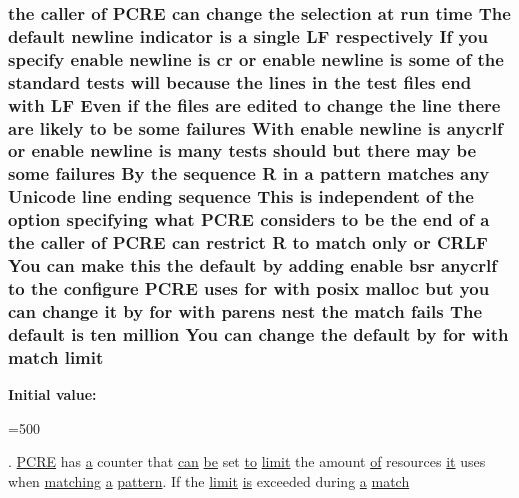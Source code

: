 \subsubsection[{\texorpdfstring{limit}{limit}}]{\setlength{\rightskip}{0pt plus 5cm}the caller {\bf of} {\bf P\+C\+RE} {\bf can} change the selection at {\bf run} {\bf time} The {\bf default} {\bf newline} indicator {\bf is} {\bf a} single {\bf LF} {\bf respectively} If you specify enable {\bf newline} {\bf is} {\bf cr} {\bf or} enable {\bf newline} {\bf is} some {\bf of} the standard {\bf tests} will because the {\bf lines} {\bf in} the test {\bf files} {\bf end} {\bf with} {\bf LF} Even {\bf if} the {\bf files} {\bf are} edited {\bf to} change the {\bf line} there {\bf are} likely {\bf to} {\bf be} some failures With enable {\bf newline} {\bf is} anycrlf {\bf or} enable {\bf newline} {\bf is} many {\bf tests} should but there may {\bf be} some failures By the {\bf sequence} {\bf R} {\bf in} {\bf a} {\bf pattern} {\bf matches} {\bf any} {\bf Unicode} {\bf line} ending {\bf sequence} This {\bf is} independent {\bf of} the {\bf option} {\bf specifying} {\bf what} {\bf P\+C\+RE} considers {\bf to} {\bf be} the {\bf end} {\bf of} {\bf a} the caller {\bf of} {\bf P\+C\+RE} {\bf can} restrict {\bf R} {\bf to} {\bf match} only {\bf or} {\bf C\+R\+LF} You {\bf can} {\bf make} {\bf this} the {\bf default} by {\bf adding} enable bsr anycrlf {\bf to} the {\bf configure} {\bf P\+C\+RE} uses for {\bf with} posix {\bf malloc} but you {\bf can} change {\bf it} by for {\bf with} parens nest the {\bf match} {\bf fails} The {\bf default} {\bf is} ten {\bf million} You {\bf can} change the {\bf default} by for {\bf with} {\bf match} limit}\hypertarget{README_8txt_aa4bc939c63755f8ebf214b60d65694b3}{}\label{README_8txt_aa4bc939c63755f8ebf214b60d65694b3}
{\bfseries Initial value\+:}
\begin{DoxyCode}
=500

. \hyperlink{pcre_8txt_a71e4557e7248fceb9478528030bfb7a5}{PCRE} has \hyperlink{group__APACHE__CORE__FASTCGI_ga72a200675828d2c2550eb6c686b9db49}{a} counter that \hyperlink{NON-AUTOTOOLS-BUILD_8txt_a13fc6af2ed5289933c1bccc61e950f56}{can} \hyperlink{pcre_8txt_a0f371a71e23776f0a08338302f581327}{be} \textcolor{keyword}{set} \hyperlink{group__MOD__PROXY_ga4d80b46c1e04eba6561893714933df30}{to} \hyperlink{README_8txt_aa4bc939c63755f8ebf214b60d65694b3}{limit} the amount \hyperlink{pcre_8txt_a9d5b55a535a7d176d14b62d664b47b4d}{of} resources 
      \hyperlink{pcretest_8txt_ab977b64dbdb969ce031dc4281a792b3c}{it} uses
  when \hyperlink{pcregrep_8txt_a48f1285cbc2f880efa6527e2a20a2afa}{matching} \hyperlink{group__APACHE__CORE__FASTCGI_ga72a200675828d2c2550eb6c686b9db49}{a} \hyperlink{ap__regex_8h_a6e94763e2b1ed0b1fe86a58eb5e1eb73}{pattern}. If the \hyperlink{README_8txt_aa4bc939c63755f8ebf214b60d65694b3}{limit} \hyperlink{pcre_8txt_a7d947c770a43ed118ff283c41a1b303c}{is} exceeded during 
      \hyperlink{group__APACHE__CORE__FASTCGI_ga72a200675828d2c2550eb6c686b9db49}{a} \hyperlink{README_8txt_ab4dbc9fcf813f9be3b8f4c7ef13868f7}{match}
\end{DoxyCode}
